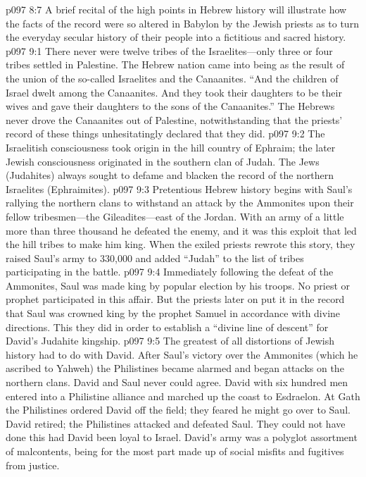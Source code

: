 \pc \vs p097 8:7 A brief recital of the high points in Hebrew history will illustrate how the facts of the record were so altered in Babylon by the Jewish priests as to turn the everyday secular history of their people into a fictitious and sacred history.
%
\vs p097 9:1 There never were twelve tribes of the Israelites---only three or four tribes settled in Palestine. The Hebrew nation came into being as the result of the union of the so\hyp{}called Israelites and the Canaanites. “And the children of Israel dwelt among the Canaanites. And they took their daughters to be their wives and gave their daughters to the sons of the Canaanites.” The Hebrews never drove the Canaanites out of Palestine, notwithstanding that the priests’ record of these things unhesitatingly declared that they did.
\vs p097 9:2 The Israelitish consciousness took origin in the hill country of Ephraim; the later Jewish consciousness originated in the southern clan of Judah. The Jews (Judahites) always sought to defame and blacken the record of the northern Israelites (Ephraimites).
\pc \vs p097 9:3 Pretentious Hebrew history begins with Saul’s rallying the northern clans to withstand an attack by the Ammonites upon their fellow tribesmen---the Gileadites---east of the Jordan. With an army of a little more than three thousand he defeated the enemy, and it was this exploit that led the hill tribes to make him king. When the exiled priests rewrote this story, they raised Saul’s army to 330,000 and added “Judah” to the list of tribes participating in the battle.
\vs p097 9:4 Immediately following the defeat of the Ammonites, Saul was made king by popular election by his troops. No priest or prophet participated in this affair. But the priests later on put it in the record that Saul was crowned king by the prophet Samuel in accordance with divine directions. This they did in order to establish a “divine line of descent” for David’s Judahite kingship.
\vs p097 9:5 The greatest of all distortions of Jewish history had to do with David. After Saul’s victory over the Ammonites (which he ascribed to Yahweh) the Philistines became alarmed and began attacks on the northern clans. David and Saul never could agree. David with six hundred men entered into a Philistine alliance and marched up the coast to Esdraelon. At Gath the Philistines ordered David off the field; they feared he might go over to Saul. David retired; the Philistines attacked and defeated Saul. They could not have done this had David been loyal to Israel. David’s army was a polyglot assortment of malcontents, being for the most part made up of social misfits and fugitives from justice.
